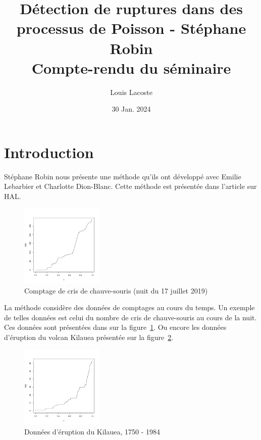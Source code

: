 \documentclass[a4paper,10pt]{article}\usepackage[]{graphicx}\usepackage[]{xcolor}
\title{\vspace{-1.5cm}\large Détection de ruptures dans des processus de Poisson - Stéphane Robin\\
\small Compte-rendu du séminaire\vspace{-0.5cm}}
\date{\small 30 Jan. 2024}
\author{\small Louis Lacoste}
\begin{document}
\maketitle

\section{Introduction}

Stéphane Robin nous présente une méthode qu'ils ont développé avec Emilie Lebarbier
et Charlotte Dion-Blanc. Cette méthode est présentée dans l'article 
\cite{dion-blancDetectionRupturesMultiples2023} sur HAL.

\begin{figure}
    \centering
    \includegraphics[width=0.35\textwidth]{graph-cris-chauve-souris}
    \caption{Comptage de cris de chauve-souris (nuit du 17 juillet 2019)}
    \label{fig:graph-cris-chauve-souris}
\end{figure}

La méthode considère des données de comptages au cours du temps. Un exemple de 
telles données est celui du nombre de cris de chauve-souris au cours de la nuit.
Ces données sont présentées dans sur la figure~\ref{fig:graph-cris-chauve-souris}.
Ou encore les données d'éruption du volcan Kilauea présentée sur la figure~\ref{fig:graph-eruption-kilauea}.

\begin{figure}
    \centering
    \includegraphics[width=0.35\textwidth]{graph-eruption-kilauea}
    \caption{Données d'éruption du Kilauea, 1750 - 1984}
    \label{fig:graph-eruption-kilauea}
\end{figure}
\end{document}
